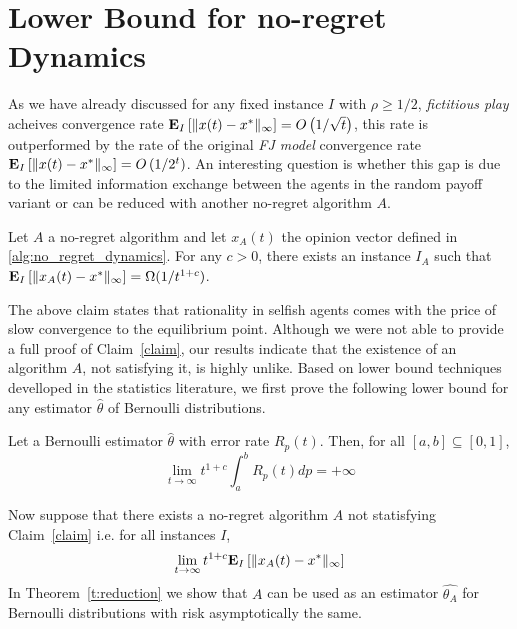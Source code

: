 \section{Lower Bound for no-regret Dynamics}\label{s:lower_bound}
As we have already discussed for any fixed instance $I$ with $\rho\geq 1/2$, \emph{fictitious play} acheives convergence rate $\bm{\mathrm{E}}_{I} \left[ \| x(t)-x^* \|_{\infty} \right]=O\left(1/\sqrt{t}\right)$, this rate is outperformed by
the rate of the original \emph{FJ model} convergence rate $\bm{\mathrm{E}}_{I} \left[ \| x(t)-x^* \|_{\infty} \right]=O\left(1/2^{t}\right)$. An interesting question is whether this gap
is due to the limited information exchange between the agents in the random payoff variant or can be reduced with another no-regret algorithm $A$.

\begin{claim}\label{claim}
Let $A$ a no-regret algorithm and let $x_A(t)$ the opinion vector defined in \ref{alg:no_regret_dynamics}.
For any $c>0$, there exists an instance $I_A$ such that $\bm{\mathrm{E}}_{I} \left[ \| x_A(t)-x^* \|_{\infty} \right] = \Omega(1/t^{1+c})$.
\end{claim}


The above claim states that rationality in selfish agents comes with the price of slow convergence to the equilibrium point.
Although we were not able to provide a full proof of Claim~\ref{claim}, our results indicate that
the existence of an algorithm $A$, not satisfying it, is highly unlike. Based on lower bound techniques develloped
in the statistics literature, we first prove the following lower bound for any estimator $\hat{\theta}$ of Bernoulli distributions.

\begin{theorem}\label{t:integral}
Let a Bernoulli estimator $\hat{\theta}$ with error rate $R_p(t)$. Then, for all $[a,b] \subseteq [0,1]$,
\[ \lim_{t \to \infty}t^{1+c} \int_{a}^{b}R_p(t)dp = +\infty\]
\end{theorem}

\noindent Now suppose that there exists a no-regret algorithm $A$ not statisfying Claim~\ref{claim} i.e. for all instances $I$, \[\lim_{t\rightarrow \infty}t^{1+c}\bm{\mathrm{E}}_{I} \left[ \| x_A(t)-x^* \|_{\infty} \right]\]
In Theorem~\ref{t:reduction} we show that $A$ can be used as an estimator $\hat{\theta_A}$ for Bernoulli distributions with risk asymptotically the same.

